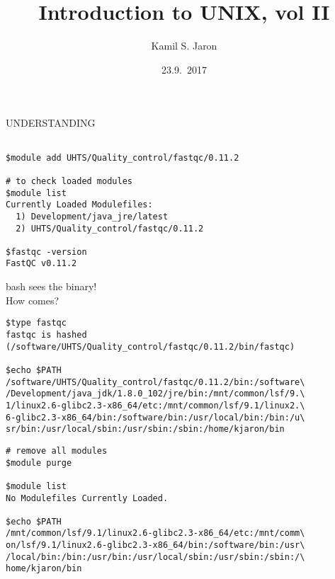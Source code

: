\documentclass[xcolor=dvipsnames]{beamer}
\title[ ]{Introduction to UNIX, vol II}
\author{Kamil S. Jaron}
\date{23.9.~2017}
\begin{document}
\begin{frame}
	\titlepage
\end{frame}

\begin{frame}
	UNDERSTANDING
\end{frame}

\begin{frame}[fragile]
\large
\begin{verbatim}

$module add UHTS/Quality_control/fastqc/0.11.2

# to check loaded modules
$module list
Currently Loaded Modulefiles:
  1) Development/java_jre/latest
  2) UHTS/Quality_control/fastqc/0.11.2

$fastqc -version
FastQC v0.11.2
\end{verbatim}
\end{frame}

\begin{frame}
	\begin{center}
		\Huge
		bash sees the binary!\\
		\vspace{1cm}
		\Large
		How comes?
	\end{center}
\end{frame}

\begin{frame}[fragile]
\footnotesize
\begin{verbatim}
$type fastqc
fastqc is hashed
(/software/UHTS/Quality_control/fastqc/0.11.2/bin/fastqc)

$echo $PATH
/software/UHTS/Quality_control/fastqc/0.11.2/bin:/software\
/Development/java_jdk/1.8.0_102/jre/bin:/mnt/common/lsf/9.\
1/linux2.6-glibc2.3-x86_64/etc:/mnt/common/lsf/9.1/linux2.\
6-glibc2.3-x86_64/bin:/software/bin:/usr/local/bin:/bin:/u\
sr/bin:/usr/local/sbin:/usr/sbin:/sbin:/home/kjaron/bin
\end{verbatim}
\end{frame}

\begin{frame}[fragile]
\footnotesize
\begin{verbatim}
# remove all modules
$module purge

$module list
No Modulefiles Currently Loaded.

$echo $PATH
/mnt/common/lsf/9.1/linux2.6-glibc2.3-x86_64/etc:/mnt/comm\
on/lsf/9.1/linux2.6-glibc2.3-x86_64/bin:/software/bin:/usr\
/local/bin:/bin:/usr/bin:/usr/local/sbin:/usr/sbin:/sbin:/\
home/kjaron/bin
\end{verbatim}
\end{frame}
\end{document}
